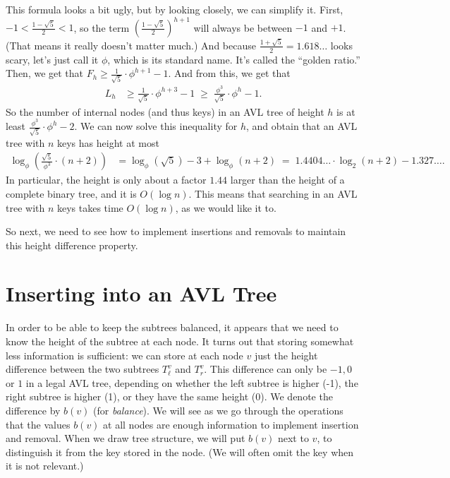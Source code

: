 This formula looks a bit ugly, but by looking closely, we can simplify
it. First, $-1 < \frac{1-\sqrt{5}}{2} < 1$, so the term
$\left( \frac{1-\sqrt{5}}{2} \right)^{h+1}$ will always be
between $-1$ and $+1$. (That means it really doesn't matter much.)
And because $\frac{1+\sqrt{5}}{2} = 1.618\ldots$ looks scary, let's
just call it $\phi$, which is its standard name. 
It's called the ``golden ratio.''
Then, we get that
$F_h \geq \frac{1}{\sqrt{5}} \cdot \phi^{h+1} - 1$.
And from this, we get that
\begin{align*}
L_h & \geq \frac{1}{\sqrt{5}} \cdot \phi^{h+3} - 1
\; \geq \; \frac{\phi^3}{\sqrt{5}} \cdot \phi^h - 1.
\end{align*}
So the number of internal nodes (and thus keys) in an AVL tree of
height $h$ is at least $\frac{\phi^3}{\sqrt{5}} \cdot \phi^h - 2$.
We can now solve this inequality for $h$, and obtain that
an AVL tree with $n$ keys has height at most
\begin{align*}
\log_{\phi} (\frac{\sqrt{5}}{\phi^3} \cdot (n+2))
& = \log_{\phi} (\sqrt{5}) - 3 + \log_{\phi} (n+2)
\; = \; 1.4404\ldots \cdot \log_2(n+2) - 1.327\ldots.
\end{align*}
In particular, the height is only about a factor $1.44$ larger than
the height of a complete binary tree, and it is $O(\log n)$.
This means that searching in an AVL tree with $n$ keys takes time
$O(\log n)$, as we would like it to.

So next, we need to see how to implement insertions and removals to
maintain this height difference property.

\section{Inserting into an AVL Tree}
In order to be able to keep the subtrees balanced, it appears that we
need to know the height of the subtree at each node.
It turns out that storing somewhat less information is sufficient:
we can store at each node $v$ just the height difference between the
two subtrees $T^v_{\ell}$ and $T^v_r$.
This difference can only be $-1, 0$ or $1$ in a legal AVL tree,
depending on whether the left subtree is higher (-1), the right
subtree is higher (1), or they have the same height (0).
We denote the difference by $b(v)$ (for \emph{balance}).
We will see as we go through the operations that the values $b(v)$ at
all nodes are enough information to implement insertion and removal.
When we draw tree structure, we will put $b(v)$ next to $v$,
to distinguish it from the key stored in the node. 
(We will often omit the key when it is not relevant.)

